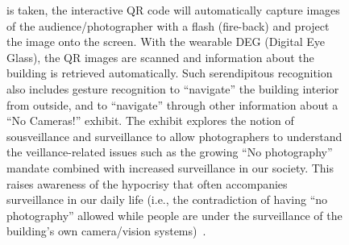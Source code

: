 \begin{figure}[!t]
{ is taken, the interactive QR code will automatically capture images of the
 audience/photographer with a flash (fire-back) and project the image onto the
 screen. With the wearable DEG (Digital Eye Glass), the QR images are
 scanned and information about the building is retrieved automatically.
 Such serendipitous recognition also includes gesture recognition to
 ``navigate'' the building interior from outside, and to ``navigate''
 through other information about a ``No Cameras!'' exhibit.
 The exhibit explores the notion of sousveillance and surveillance to
 allow photographers to understand the veillance-related issues such
 as the growing ``No photography'' mandate combined with increased surveillance
 in our society.
 This raises awareness of the hypocrisy that often accompanies
 surveillance in our daily life (i.e., the contradiction of having
 ``no photography''
 allowed while people are under the surveillance of the building's own
 camera/vision systems)~\cite{lo2013augmediated}.
}
    \label{building}
\end{figure}


